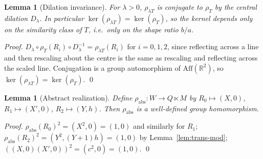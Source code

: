 \documentclass[11pt,a4paper]{article}
\newtheorem{lemma}[theorem]{Lemma}
\theoremstyle{remark}
\theoremstyle{plain}
\begin{document}
\begin{lemma}[Dilation invariance]
\label{lem:dilation-invariance}
For $\lambda > 0$, $\rho_{\lambda T}$ is conjugate to $\rho_T$ by the
central dilation $D_\lambda$.  In particular $\ker(\rho_{\lambda T}) =
\ker(\rho_T)$, so the kernel depends only on the similarity class of $T$,
i.e.\ only on the shape ratio $b/a$.
\end{lemma}

\begin{proof}
$D_\lambda \circ \rho_T(R_i) \circ D_\lambda^{-1} = \rho_{\lambda T}(R_i)$
for $i = 0, 1, 2$, since reflecting across a line and then rescaling
about the centre is the same as rescaling and reflecting across the
scaled line.  Conjugation is a group automorphism of
$\mathrm{Aff}(\mathbb{R}^2)$, so $\ker(\rho_{\lambda T}) = \ker(\rho_T)$.
\qed
\end{proof}

\begin{lemma}[Abstract realization]
\label{lem:rho-abs}
Define $\rho_{\mathrm{abs}} : W \to Q \ltimes M$ by
$R_0 \mapsto (X, 0)$, $R_1 \mapsto (X', 0)$, $R_2 \mapsto (Y, h)$.
Then $\rho_{\mathrm{abs}}$ is a well-defined group homomorphism.
\end{lemma}

\begin{proof}
$\rho_{\mathrm{abs}}(R_0)^2 = (X^2, 0) = (1, 0)$ and similarly for $R_1$;
$\rho_{\mathrm{abs}}(R_2)^2 = (Y^2, (Y+1) h) = (1, 0)$ by Lemma~\ref{lem:trans-mod};
$((X,0)(X',0))^2 = (c^2, 0) = (1, 0)$.
\qed
\end{proof}
\end{document}

